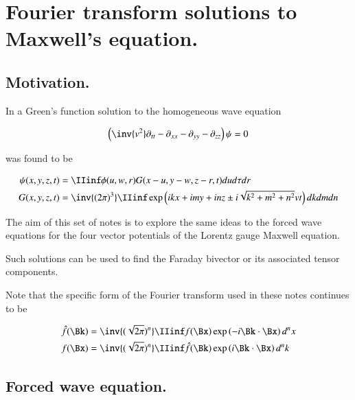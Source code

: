 \chapter{Fourier transform solutions to Maxwell's equation.}\label{chap:PJfourierMaxwellSecondOrder}
\date{Jan 29, 2009.  fourierMaxwell.tex}

\section{Motivation. }

In  a Green's function solution to the homogeneous
wave equation

\begin{align}\label{eqn:fourier_maxwell:wave}
\left(\inv{v^2} \partial_{tt} -\partial_{xx} -\partial_{yy} -\partial_{zz} \right)\psi = 0
\end{align}

was found to be

\begin{align}\label{eqn:fourier_maxwell:greensSolution3d}
{\psi}(x,y,z,t) &= \IIinf \phi(u,w,r) G( x-u, y-w, z-r, t) du d\tau dr \\
G(x,y,z,t) &= \inv{({2\pi})^3} \IIinf \exp\left( i k x + i m y + i n z \pm i \sqrt{k^2 + m^2 + n^2} v t \right) dk dm dn
\end{align}

The aim of this set of notes is to explore the same ideas to the forced wave
equations for the four vector potentials of the Lorentz gauge Maxwell equation.

Such solutions can be used to find the Faraday bivector or its associated
tensor components.

Note that the specific form of the Fourier transform used in these notes continues to be

\begin{align}
\hat{f}(\Bk) &= \inv{(\sqrt{2\pi})^n} \IIinf f(\Bx) \exp\left( -i \Bk \cdot \Bx \right) d^n x \\
{f}(\Bx) &= \inv{(\sqrt{2\pi})^n} \IIinf \hat{f}(\Bk) \exp\left( i \Bk \cdot \Bx \right) d^n k
\end{align}

\section{Forced wave equation. }

